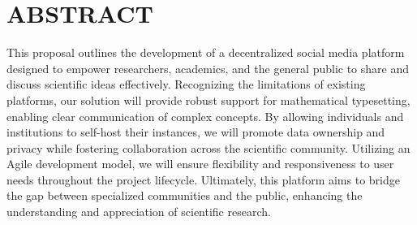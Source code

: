 \chapter*{ABSTRACT}

This proposal outlines the development of a decentralized social media platform designed to empower researchers, academics, and the general public to share and discuss scientific ideas effectively. Recognizing the limitations of existing platforms, our solution will provide robust support for mathematical typesetting, enabling clear communication of complex concepts. By allowing individuals and institutions to self-host their instances, we will promote data ownership and privacy while fostering collaboration across the scientific community. Utilizing an Agile development model, we will ensure flexibility and responsiveness to user needs throughout the project lifecycle. Ultimately, this platform aims to bridge the gap between specialized communities and the public, enhancing the understanding and appreciation of scientific research.
